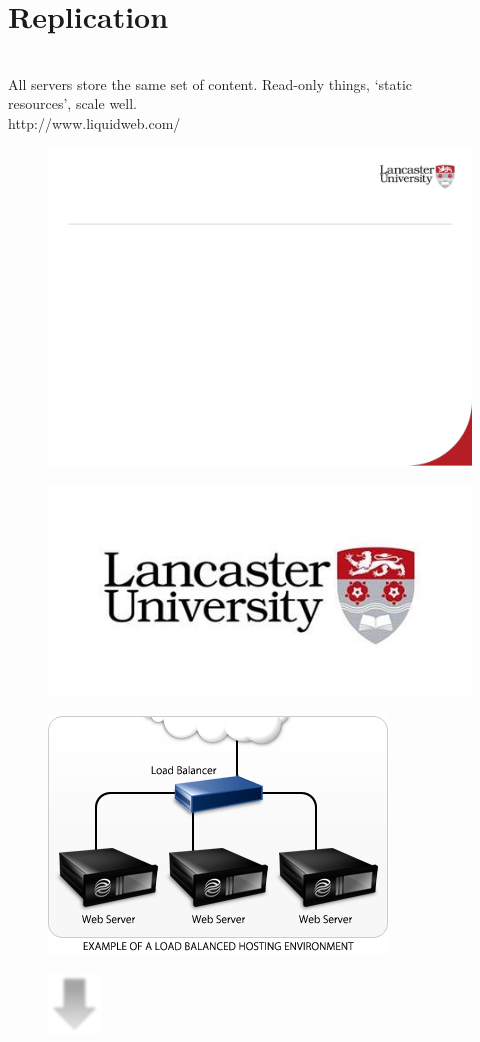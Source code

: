 \documentclass[12pt]{article}
\begin{document}
\section{Replication}
\\
All servers store the same set of content. Read-only things, ‘static \\
resources’, scale well.\\
http://www.liquidweb.com/\\
\begin{figure}[H]
\includegraphics[width=0.5\linewidth]{page75-image-1.png}
\end{figure}
\begin{figure}[H]
\includegraphics[width=0.5\linewidth]{page75-image-2.png}
\end{figure}
\begin{figure}[H]
\includegraphics[width=0.5\linewidth]{page75-image-3.png}
\end{figure}
\begin{figure}[H]
\includegraphics[width=0.5\linewidth]{page75-image-4.png}
\end{figure}
\end{document}
